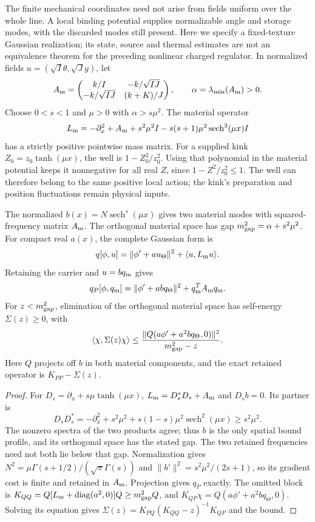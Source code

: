 The finite mechanical coordinates need not arise from fields uniform
over the whole line. A local binding potential supplies normalizable
angle and storage modes, with the discarded modes still present.
Here we specify a fixed-texture Gaussian realization; its state,
source and thermal estimates are not an equivalence theorem for the
preceding nonlinear charged regulator.
In normalized fields $u=(\sqrt I\theta,\sqrt J y)$, let
\[
 A_{\rm m}=\begin{pmatrix}k/I&-k/\sqrt{IJ}\\
              -k/\sqrt{IJ}&(k+K)/J\end{pmatrix},
 \qquad \alpha=\lambda_{\min}(A_{\rm m})>0.
\]
Choose $0<s<1$ and $\mu>0$ with $\alpha>s\mu^2$.
The material operator
\[
 L_{\rm m}=-\partial_x^2+A_{\rm m}+s^2\mu^2I
              -s(s+1)\mu^2\operatorname{sech}^2(\mu x)I
\]
has a strictly positive pointwise mass matrix.
For a supplied kink $Z_0=z_0\tanh(\mu x)$, the well is
$1-Z_0^2/z_0^2$. Using that polynomial in the material potential
keeps it nonnegative for all real $Z$, since $1-Z^2/z_0^2\le1$.
The well can therefore belong to the same positive local action;
the kink's preparation and position fluctuations remain physical inputs.

\begin{proposition}
\label{prop:finite-material-mode}
The normalized $b(x)=N\operatorname{sech}^s(\mu x)$ gives two
material modes with squared-frequency matrix $A_{\rm m}$.
The orthogonal material space has gap
$m_{\rm gap}^2=\alpha+s^2\mu^2$.
For compact real $a(x)$, the complete Gaussian form is
\[
 q[\phi,u]=\|\phi'+a u_\Theta\|^2+\langle u,L_{\rm m}u\rangle.
\]
Retaining the carrier and $u=bq_{\rm m}$ gives
\[
 q_P[\phi,q_{\rm m}]=\|\phi'+ab q_\Theta\|^2
                              +q_{\rm m}^T A_{\rm m}q_{\rm m}.
\]
For $z<m_{\rm gap}^2$, elimination of the orthogonal material
space has self-energy $\Sigma(z)\ge0$, with
\[
 \langle\chi,\Sigma(z)\chi\rangle
 \le\frac{\|Q(a\phi'+a^2bq_\Theta,0)\|^2}{m_{\rm gap}^2-z}.
\]
Here $Q$ projects off $b$ in both material components, and the
exact retained operator is $K_{PP}-\Sigma(z)$.
\end{proposition}
\begin{proof}
For $D_s=\partial_x+s\mu\tanh(\mu x)$,
$L_{\rm m}=D_s^*D_s+A_{\rm m}$ and $D_sb=0$.
Its partner is
\[
 D_sD_s^*=-\partial_x^2+s^2\mu^2+
                       s(1-s)\mu^2\operatorname{sech}^2(\mu x)
                       \ge s^2\mu^2.
\]
The nonzero spectra of the two products agree; thus $b$ is the only
spatial bound profile, and its orthogonal space has the stated gap.
The two retained frequencies need not both lie below that gap.
Normalization gives
$N^2=\mu\Gamma(s+1/2)/(\sqrt\pi\Gamma(s))$ and
$\|b'\|^2=s^2\mu^2/(2s+1)$, so its gradient cost is finite and
retained in $A_{\rm m}$. Projection gives $q_P$ exactly.
The omitted block is
$K_{QQ}=Q[L_{\rm m}+\operatorname{diag}(a^2,0)]Q
\ge m_{\rm gap}^2Q$, and
$K_{QP}\chi=Q(a\phi'+a^2bq_\Theta,0)$.
Solving its equation gives
$\Sigma(z)=K_{PQ}(K_{QQ}-z)^{-1}K_{QP}$ and the bound.
\end{proof}

